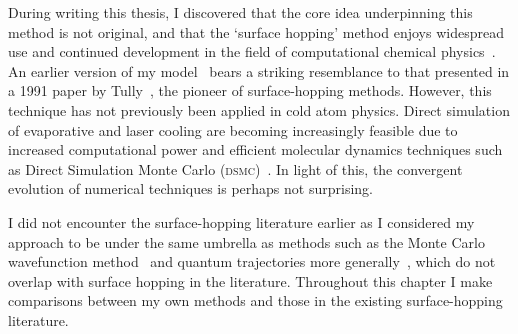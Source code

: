 During writing this thesis, I discovered that the core idea underpinning this method is not original, and that the `surface hopping' method enjoys widespread use and continued development in the field of computational chemical physics~\cite{doi:10.1063/1.459170, A801824C, doi:10.1146/annurev-physchem-040215-112245, doi:10.1063/1.1675788, doi:10.1063/1.3575588, doi:10.1063/1.447708, doi:10.1063/1.3489004, doi:10.1063/1.2715585, C6SC01319H, doi:10.1063/1.479058, doi:10.1063/1.4829856}. An earlier version of my model~\cite{billington_monte_2015} bears a striking resemblance to that presented in a 1991 paper by Tully~\cite{doi:10.1063/1.459170}, the pioneer of surface-hopping methods. However, this technique has not previously been applied in cold atom physics. Direct simulation of evaporative and laser cooling are becoming increasingly feasible due to increased computational power and efficient molecular dynamics techniques such as Direct Simulation Monte Carlo (\textsc{dsmc})~\cite{DIETRICH1996328}. In light of this, the convergent evolution of numerical techniques is perhaps not surprising.

I did not encounter the surface-hopping literature earlier as I considered my approach to be under the same umbrella as methods such as the Monte Carlo wavefunction method~\cite{Molmer:93} and quantum trajectories more generally~\cite{1355-5111-8-1-015, 2003LNP...622..233H}, which do not overlap with surface hopping in the literature. Throughout this chapter I make comparisons between my own methods and those in the existing surface-hopping literature.

